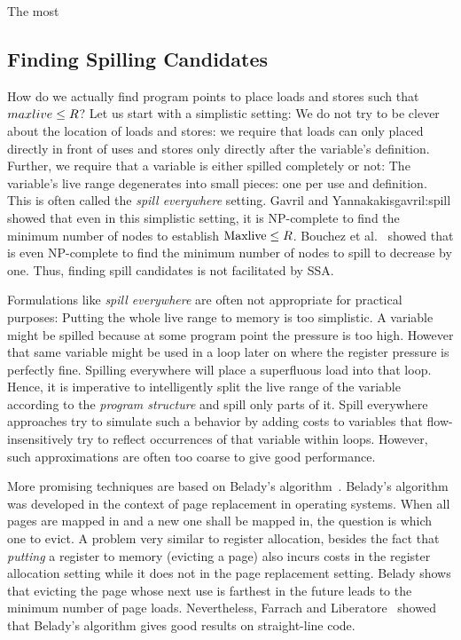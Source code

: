 {The most 

\subsection{Finding Spilling Candidates}

How do we actually find program points to place loads and stores such that $\\maxlive\le R$?
Let us start with a simplistic setting:
We do not try to be clever about the location of loads and stores:
we require that loads can only placed directly in front of uses and stores only directly after the variable's definition.
Further, we require that a variable is either spilled completely or not:
The variable's live range degenerates into small pieces: one per use and definition.
This is often called the \emph{spill everywhere} setting.
Gavril and Yannakakis{gavril:spill} showed that even in this simplistic setting, it is NP-complete to find the minimum number of nodes to establish $\mathrm{Maxlive}\le R$.
Bouchez et al.~\cite{lctes} showed that is even NP-complete to find the minimum number of nodes to spill to decrease \maxlive by one.
Thus, finding spill candidates is not facilitated by SSA.

Formulations like \emph{spill everywhere} are often not appropriate for practical purposes:
Putting the whole live range to memory is too simplistic.
A variable might be spilled because at some program point the pressure is too high.
However that same variable might be used in a loop later on where the register pressure is perfectly fine.
Spilling everywhere will place a superfluous load into that loop.
Hence, it is imperative to intelligently split the live range of the variable according to the \emph{program structure} and spill only parts of it.
Spill everywhere approaches try to simulate such a behavior by adding costs to variables that flow-insensitively try to reflect occurrences of that variable within loops.
However, such approximations are often too coarse to give good performance.

More promising techniques are based on Belady's algorithm~\cite{belady:1966:storage}.
Belady's algorithm was developed in the context of page replacement in operating systems.
When all pages are mapped in and a new one shall be mapped in, the question is which one to evict.
A problem very similar to register allocation, besides the fact that \emph{putting} a register to memory (evicting a page) also incurs costs in the register allocation setting while it does not in the page replacement setting.
Belady shows that evicting the page whose next use is farthest in the future leads to the minimum number of page loads. 
Nevertheless, Farrach and Liberatore~\cite{farach:98:local} showed that Belady's algorithm gives good results on straight-line code.

}
